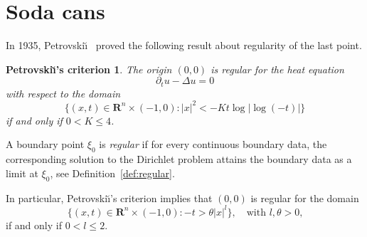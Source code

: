 \documentclass[a4paper, twoside]{article}
\theoremstyle{propositional}
\newtheorem*{Petrovskii}{Petrovski\u\i's criterion}
\theoremstyle{descriptive}
\numberwithin{equation}{section}
\newcommand{\Rn}{\mathbf{R}^n}
\newcommand{\bdry}{\partial}
\begin{document}



\section{Soda cans}


In 1935, Petrovski\u\i~\cite{Petro2} proved the following result
about regularity of the last point.


\begin{Petrovskii}
The origin $(0,0)$ is regular for the heat equation
\[
\bdry_t u-\Delta u=0    
\]
with respect to the domain
\begin{equation*} %
 \{(x,t) \in \Rn\times(-1,0):
        |x|^2<-Kt \log |{\log(-t)}| \}
\end{equation*}
if and only if\/ $0<K\le4$.
\end{Petrovskii}





A boundary point $\xi_0$ is \emph{regular}
if for every continuous boundary data, the corresponding
solution to the Dirichlet problem 
attains the boundary data as a limit at $\xi_0$,
see Definition~\ref{def:regular}.


In particular, Petrovski\u\i's criterion implies that $(0,0)$ is regular for the domain
\begin{equation}   \label{eq-Petrovskii-set}
\{(x,t)\in \Rn \times (-1,0): -t > \theta |x|^l\},
\quad 
\text{with $l,\theta >0$,}
\end{equation}
if and only if  $0 < l \le 2$.
\end{document}

